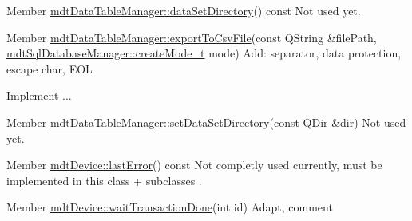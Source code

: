 \label{todo__todo000082}
\hypertarget{todo__todo000082}{}
 
\begin{DoxyDescription}
\item[Member \hyperlink{classmdt_data_table_manager_a8fa0924a76e8f3fec9617f690cc4e148}{mdtDataTableManager::dataSetDirectory}() const  ]Not used yet. 
\end{DoxyDescription}

\label{todo__todo000083}
\hypertarget{todo__todo000083}{}
 
\begin{DoxyDescription}
\item[Member \hyperlink{classmdt_data_table_manager_abe733f071ca77579522823598e79dd9a}{mdtDataTableManager::exportToCsvFile}(const QString \&filePath, \hyperlink{classmdt_sql_database_manager_a2f5b46d67a88095053a5edfc415c7418}{mdtSqlDatabaseManager::createMode\_\-t} mode) ]Add: separator, data protection, escape char, EOL 

Implement ... 
\end{DoxyDescription}

\label{todo__todo000081}
\hypertarget{todo__todo000081}{}
 
\begin{DoxyDescription}
\item[Member \hyperlink{classmdt_data_table_manager_a1e19b3f34c1b0a91bcae4396731efc57}{mdtDataTableManager::setDataSetDirectory}(const QDir \&dir) ]Not used yet. 
\end{DoxyDescription}

\label{todo__todo000006}
\hypertarget{todo__todo000006}{}
 
\begin{DoxyDescription}
\item[Member \hyperlink{classmdt_device_a79ca328ff9e9f413a38c1cc9c9267cee}{mdtDevice::lastError}() const  ]Not completly used currently, must be implemented in this class + subclasses . 
\end{DoxyDescription}

\label{todo__todo000007}
\hypertarget{todo__todo000007}{}
 
\begin{DoxyDescription}
\item[Member \hyperlink{classmdt_device_ab937015c1a319b7234442a4cc29a02a8}{mdtDevice::waitTransactionDone}(int id) ]Adapt, comment
\end{DoxyDescription}

\label{todo__todo000034}
\hypertarget{todo__todo000034}{}
 
